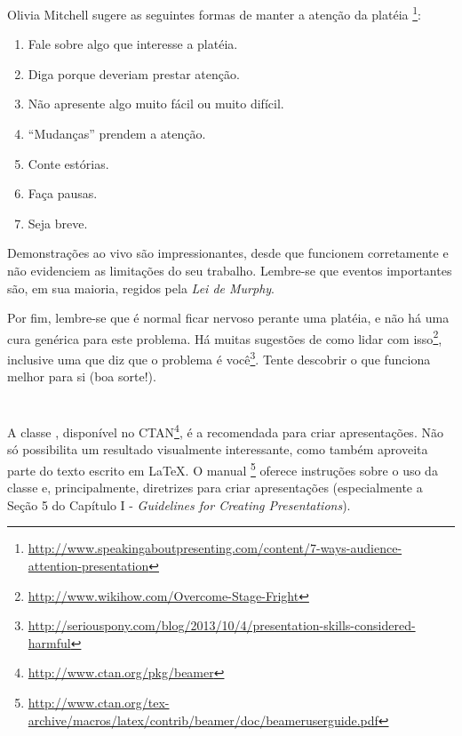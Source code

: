 Olivia Mitchell sugere as seguintes formas de manter a atenção da platéia%
\footnote{\url{http://www.speakingaboutpresenting.com/content/7-ways-audience-attention-presentation}}:
\begin{enumerate}
\item Fale sobre algo que interesse a platéia.
\item Diga porque deveriam prestar atenção.
\item Não apresente algo muito fácil ou muito difícil.
\item ``Mudanças'' prendem a atenção.
\item Conte estórias.
\item Faça pausas.
\item Seja breve.
\end{enumerate}

Demonstrações ao vivo são impressionantes, desde que funcionem corretamente e não
evidenciem as limitações do seu trabalho. Lembre-se que eventos importantes são, 
em sua maioria, regidos pela \emph{Lei de Murphy}.%

Por fim, lembre-se que é normal ficar nervoso perante uma platéia, e não há uma 
cura genérica para este problema. Há muitas sugestões de como lidar com isso\footnote{\url{http://www.wikihow.com/Overcome-Stage-Fright}}, 
inclusive uma que diz que o problema é você\footnote{\url{http://seriouspony.com/blog/2013/10/4/presentation-skills-considered-harmful}}.
Tente descobrir o que funciona melhor para si (boa sorte!).


\newcommand{\beamer}{{}}%
\section{\beamer}
A classe \beamer, disponível no CTAN\footnote{\url{http://www.ctan.org/pkg/beamer}},
é a recomendada para criar apresentações. Não só possibilita um resultado visualmente
interessante, como também aproveita parte do texto escrito em \LaTeX. O manual%
\footnote{\url{http://www.ctan.org/tex-archive/macros/latex/contrib/beamer/doc/beameruserguide.pdf}} 
oferece instruções sobre o uso da classe e, principalmente, diretrizes para criar
apresentações (especialmente a Seção 5 do Capítulo I - \emph{Guidelines for 
Creating Presentations}).